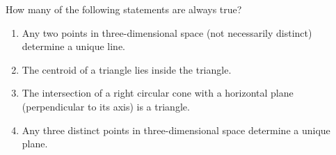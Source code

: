 How many of the following statements are always true?
\begin{enumerate}
\item[i.] Any two points in three-dimensional space (not necessarily distinct) determine a unique line.
\item[ii.] The centroid of a triangle lies inside the triangle.
\item[iii.] The intersection of a right circular cone with a horizontal plane (perpendicular to its axis) is a triangle.
\item[iv.] Any three distinct points in three-dimensional space determine a unique plane.
\end{enumerate}
